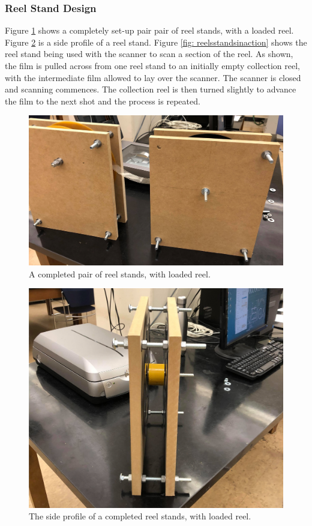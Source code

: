 \documentclass[12pt]{article} %
\begin{document}
\subsubsection{Reel Stand Design}
Figure \ref{fig: full setup} shows a completely set-up pair pair of reel stands, with a loaded reel. Figure \ref{fig: side profile} is a side profile of a reel stand. Figure \ref{fig: reelsstandsinaction} shows the reel stand being used with the scanner to scan a section of the reel. As shown, the film is pulled across from one reel stand to an initially empty collection reel, with the intermediate film allowed to lay over the scanner. The scanner is closed and scanning commences. The collection reel is then turned slightly to advance the film to the next shot and the process is repeated.
\begin{figure}[H]
    \centering
    \includegraphics[width=0.7\linewidth]{Images/Reel stand images/setupreelstands.jpg}
    \caption{A completed pair of reel stands, with loaded reel.}
    \label{fig: full setup}
\end{figure}
\begin{figure}[H]
    \centering
    \includegraphics[width=0.7\linewidth]{Images/Reel stand images/reelstanddone.jpg}
    \caption{The side profile of a completed reel stands, with loaded reel.}
    \label{fig: side profile}
\end{figure}
\end{document}
